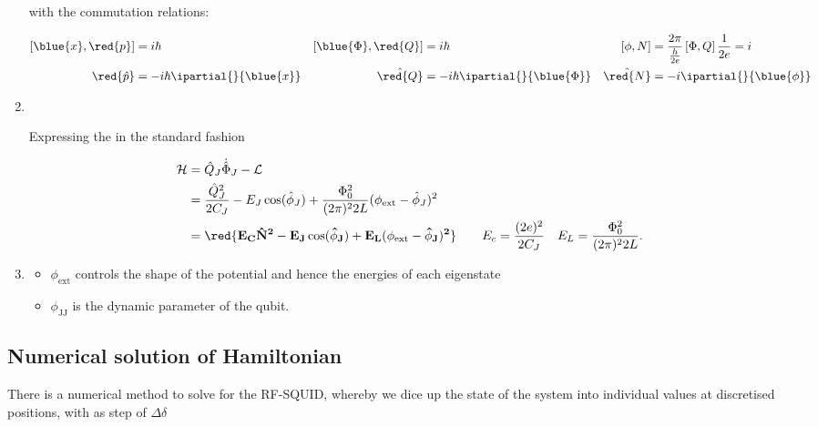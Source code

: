 \begin{enumerate}
  \noindent with the commutation relations:

  \begin{align}
    \left[\blue{x},\red{p}\right] & =i\hbar & \left[\blue{\Phi},\red{Q}\right] & = i\hbar & \left[\phi,N\right] & = \frac{2\pi}{\frac{h}{2e}}\left[\Phi,Q\right]\frac{1}{2e} = i\\
    \red{\hat{p}} & = -i\hbar\ipartial{}{\blue{x}} & \hat{\red{Q}} & =-i\hbar\ipartial{}{\blue{\Phi}} & \hat{\red{N}} & =-i\ipartial{}{\blue{\phi}}
  \end{align}

\item\

\begin{framed}\noindent
  Expressing the  in the standard fashion

  \begin{equation}
    \begin{aligned}
      \mathcal{H} & = \hat{Q}_J\dot{\hat{\Phi}}_J - \mathcal{L}\\
      & = \frac{\hat{Q}_J^2}{2C_J} - E_J\cos(\hat{\phi}_J) + \frac{\Phi_0^2}{(2\pi)^22L}(\phi_\text{ext}-\hat{\phi}_J)^2\\
      &    =   \mathbf{\red{E_C{\hat{N}^2}-    E_J\cos(\hat{\phi}_J)   +
          E_L(\phi_\text{ext}-\hat{\phi}_J)^2}}\qquad        E_c       =
      \frac{(2e)^2}{2C_J}\quad E_L = \frac{\Phi_0^2}{(2\pi)^22L}.
    \end{aligned}
  \end{equation}
\end{framed}

\item{}
  \begin{itemize}
  \item $  \phi_{\text{ext}} $ controls  the shape of the  potential and
    hence the energies of each eigenstate
  \item $ \phi_{\text{JJ}} $ is the dynamic parameter of the qubit.
  \end{itemize}
\end{enumerate}

\newpage
\subsection{Numerical                     solution                    of
  Hamiltonian\label{subsec:flux_numerical}}
There is a  numerical method to solve for the  RF-SQUID, whereby we dice
up  the  state of  the  system  into  individual values  at  discretised
positions, with as step of $ \Delta \delta $

